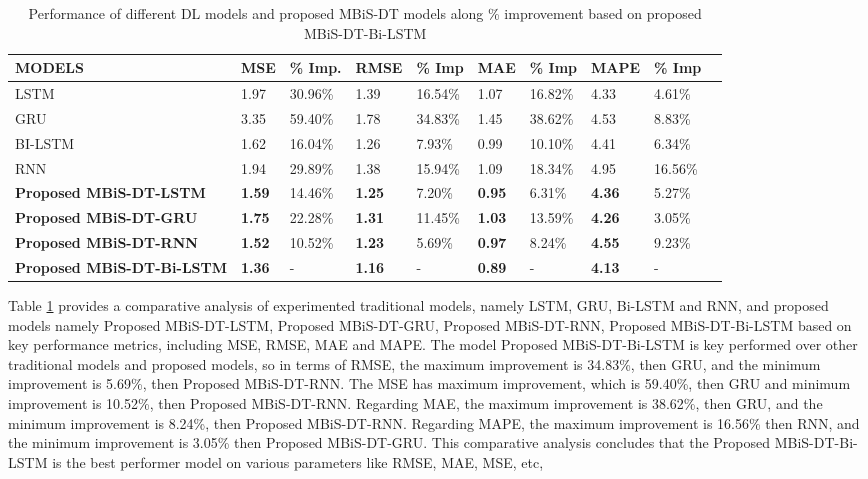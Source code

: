 \begin{table}[ht!]
\centering
\setlength{\tabcolsep}{3pt}
{\renewcommand{\arraystretch}{1}%
\caption{Performance of different DL models and proposed MBiS-DT models along \% improvement based on proposed MBiS-DT-Bi-LSTM }
\label{tab:Performance_of_different DL}
\begin{tabular}{p{}lllllllll}
\hline
\textbf{MODELS} & \textbf{MSE} & \textbf{\% Imp.} & \textbf{RMSE} & \textbf{\% Imp} & \textbf{MAE} & \textbf{\% Imp} & \textbf{MAPE} & \textbf{\% Imp} \\ \hline
LSTM & 1.97 &30.96\% & 1.39 &16.54\% & 1.07 &16.82\% & 4.33 &4.61\% \\
GRU & 3.35 &59.40\% & 1.78 &34.83\% & 1.45 & 38.62\% & 4.53 &8.83\% \\
BI-LSTM & 1.62 &16.04\% & 1.26 &7.93\% & 0.99 &10.10\% & 4.41 &6.34\% \\
RNN & 1.94 &29.89\% & 1.38 &15.94\% & 1.09 &18.34\% & 4.95&16.56\% \\
\textbf{Proposed MBiS-DT-LSTM} & \textbf{1.59} &14.46\% & \textbf{1.25} &7.20\% & \textbf{0.95} &6.31\% & \textbf{4.36} &5.27\% \\
\textbf{Proposed MBiS-DT-GRU} & \textbf{1.75} &22.28\% & \textbf{1.31} &11.45\% & \textbf{1.03} & 13.59\% & \textbf{4.26} &3.05\% \\
\textbf{Proposed MBiS-DT-RNN} & \textbf{1.52} &10.52\% & \textbf{1.23} &5.69\% & \textbf{0.97} &8.24\% & \textbf{4.55} &9.23\% \\
\textbf{Proposed MBiS-DT-Bi-LSTM} & \textbf{1.36} & - & \textbf{1.16} &- & \textbf{0.89} & - & \textbf{4.13} & - \\
\hline
\end{tabular}%
}
\end{table}


Table \ref{tab:Performance_of_different DL} provides a comparative analysis of experimented traditional models, namely LSTM, GRU, Bi-LSTM and RNN, and proposed models namely Proposed MBiS-DT-LSTM, Proposed MBiS-DT-GRU, Proposed MBiS-DT-RNN, Proposed MBiS-DT-Bi-LSTM based on key performance metrics, including MSE, RMSE, MAE and MAPE. The model Proposed MBiS-DT-Bi-LSTM is key performed over other traditional models and proposed models, so in terms of RMSE, the maximum improvement is 34.83\%, then GRU, and the minimum improvement is 5.69\%, then Proposed MBiS-DT-RNN. The MSE has maximum improvement, which is 59.40\%, then GRU and minimum improvement is 10.52\%, then Proposed MBiS-DT-RNN. Regarding MAE, the maximum improvement is 38.62\%, then GRU, and the minimum improvement is 8.24\%, then Proposed MBiS-DT-RNN. Regarding MAPE, the maximum improvement is 16.56\% then RNN, and the minimum improvement is 3.05\% then Proposed MBiS-DT-GRU. This comparative analysis concludes that the Proposed MBiS-DT-Bi-LSTM is the best performer model on various parameters like RMSE, MAE, MSE, etc,


